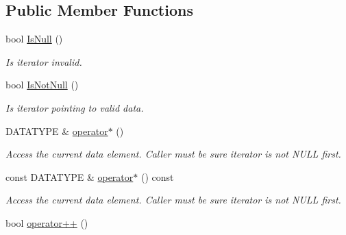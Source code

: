 \subsection*{\-Public \-Member \-Functions}
\begin{DoxyCompactItemize}
\item 
\hypertarget{class_r_tree_1_1_iterator_a23f756ac37acc2b162b61230c27732b3}{bool \hyperlink{class_r_tree_1_1_iterator_a23f756ac37acc2b162b61230c27732b3}{\-Is\-Null} ()}\label{class_r_tree_1_1_iterator_a23f756ac37acc2b162b61230c27732b3}

\begin{DoxyCompactList}\small\item\em \-Is iterator invalid. \end{DoxyCompactList}\item 
\hypertarget{class_r_tree_1_1_iterator_a8cd6bf4fa228497ac736e8d7993e7daf}{bool \hyperlink{class_r_tree_1_1_iterator_a8cd6bf4fa228497ac736e8d7993e7daf}{\-Is\-Not\-Null} ()}\label{class_r_tree_1_1_iterator_a8cd6bf4fa228497ac736e8d7993e7daf}

\begin{DoxyCompactList}\small\item\em \-Is iterator pointing to valid data. \end{DoxyCompactList}\item 
\hypertarget{class_r_tree_1_1_iterator_abb61d3a8396473b543cb15aa9002cfeb}{\-D\-A\-T\-A\-T\-Y\-P\-E \& \hyperlink{class_r_tree_1_1_iterator_abb61d3a8396473b543cb15aa9002cfeb}{operator$\ast$} ()}\label{class_r_tree_1_1_iterator_abb61d3a8396473b543cb15aa9002cfeb}

\begin{DoxyCompactList}\small\item\em \-Access the current data element. \-Caller must be sure iterator is not \-N\-U\-L\-L first. \end{DoxyCompactList}\item 
\hypertarget{class_r_tree_1_1_iterator_a45496ad72eba6929d40239ed711bf129}{const \-D\-A\-T\-A\-T\-Y\-P\-E \& \hyperlink{class_r_tree_1_1_iterator_a45496ad72eba6929d40239ed711bf129}{operator$\ast$} () const }\label{class_r_tree_1_1_iterator_a45496ad72eba6929d40239ed711bf129}

\begin{DoxyCompactList}\small\item\em \-Access the current data element. \-Caller must be sure iterator is not \-N\-U\-L\-L first. \end{DoxyCompactList}\item 
\hypertarget{class_r_tree_1_1_iterator_ad578bac71cfc7d324b84595032feda21}{bool \hyperlink{class_r_tree_1_1_iterator_ad578bac71cfc7d324b84595032feda21}{operator++} ()}\label{class_r_tree_1_1_iterator_ad578bac71cfc7d324b84595032feda21}


\end{DoxyCompactItemize}
